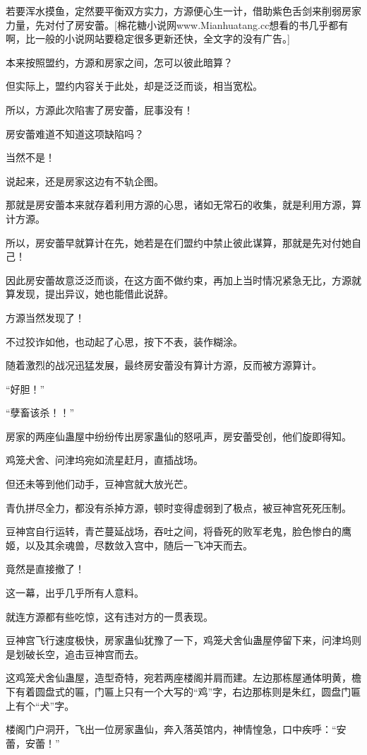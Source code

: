 \begin{this_body}
若要浑水摸鱼，定然要平衡双方实力，方源便心生一计，借助紫色舌剑来削弱房家力量，先对付了房安蕾。[棉花糖小说网www.Mianhuatang.cc想看的书几乎都有啊，比一般的小说网站要稳定很多更新还快，全文字的没有广告。]

本来按照盟约，方源和房家之间，怎可以彼此暗算？

但实际上，盟约内容关于此处，却是泛泛而谈，相当宽松。

所以，方源此次陷害了房安蕾，屁事没有！

房安蕾难道不知道这项缺陷吗？

当然不是！

说起来，还是房家这边有不轨企图。

那就是房安蕾本来就存着利用方源的心思，诸如无常石的收集，就是利用方源，算计方源。

所以，房安蕾早就算计在先，她若是在们盟约中禁止彼此谋算，那就是先对付她自己！

因此房安蕾故意泛泛而谈，在这方面不做约束，再加上当时情况紧急无比，方源就算发现，提出异议，她也能借此说辞。

方源当然发现了！

不过狡诈如他，也动起了心思，按下不表，装作糊涂。

随着激烈的战况迅猛发展，最终房安蕾没有算计方源，反而被方源算计。

“好胆！”

“孽畜该杀！！”

房家的两座仙蛊屋中纷纷传出房家蛊仙的怒吼声，房安蕾受创，他们旋即得知。

鸡笼犬舍、问津坞宛如流星赶月，直插战场。

但还未等到他们动手，豆神宫就大放光芒。

青仇拼尽全力，都没有杀掉方源，顿时变得虚弱到了极点，被豆神宫死死压制。

豆神宫自行运转，青芒蔓延战场，吞吐之间，将昏死的败军老鬼，脸色惨白的鹰姬，以及其余魂兽，尽数敛入宫中，随后一飞冲天而去。

竟然是直接撤了！

这一幕，出乎几乎所有人意料。

就连方源都有些吃惊，这有违对方的一贯表现。

豆神宫飞行速度极快，房家蛊仙犹豫了一下，鸡笼犬舍仙蛊屋停留下来，问津坞则是划破长空，追击豆神宫而去。

这鸡笼犬舍仙蛊屋，造型奇特，宛若两座楼阁并肩而建。左边那栋屋通体明黄，檐下有着圆盘式的匾，门匾上只有一个大写的“鸡”字，右边那栋则是朱红，圆盘门匾上有个“犬”字。

楼阁门户洞开，飞出一位房家蛊仙，奔入落英馆内，神情惶急，口中疾呼：“安蕾，安蕾！”


\end{this_body}
